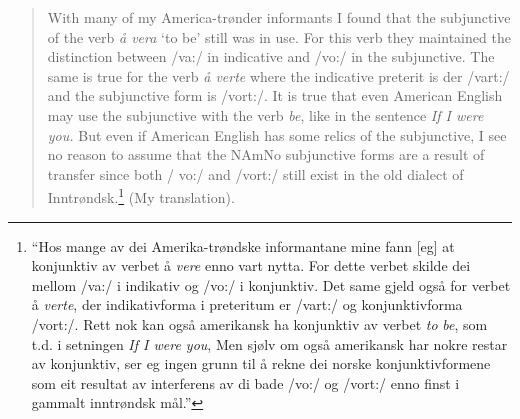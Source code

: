 \documentclass[output=paper]{langscibook}
\begin{document}
\begin{quote}
With many of my America-trønder informants I found that the subjunctive of the verb \textit{å vera} ‘to be’ still was in use. For this verb they maintained the distinction between /va:/ in indicative and /vo:/ in the subjunctive. The same is true for the verb \textit{å verte} where the indicative preterit is der /vart:/ and the subjunctive form is /vort:/. It is true that even American English may use the subjunctive with the verb \textit{be}, like in the sentence \textit{If I were you.} But even if American English has some relics of the subjunctive, I see no reason to assume that the NAmNo subjunctive forms are a result of transfer since both / vo:/ and /vort:/ still exist in the old dialect of Inntrøndsk.\footnote{“Hos mange av dei Amerika-trøndske informantane mine fann [eg] at konjunktiv av verbet å \textit{vere} enno vart nytta. For dette verbet skilde dei mellom /va:/ i indikativ og /vo:/ i konjunktiv. Det same gjeld også for verbet å \textit{verte}, der indikativforma i preteritum er /vart:/ og konjunktivforma /vort:/. Rett nok kan også amerikansk ha konjunktiv av verbet \textit{to} \textit{be}, som t.d. i setningen \textit{If I were you}, Men sjølv om også amerikansk har nokre restar av konjunktiv, ser eg ingen grunn til å rekne dei norske konjunktivformene som eit resultat av interferens av di bade /vo:/ og /vort:/ enno finst i gammalt inntrøndsk mål.”}  (My translation).
\end{quote}
\end{document}
